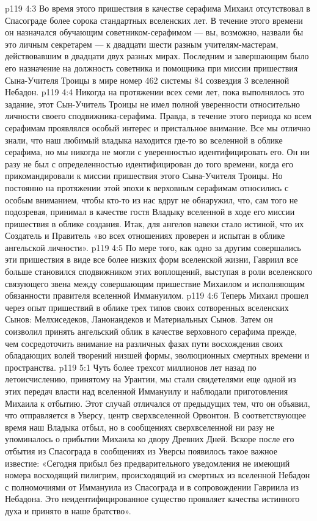 \vs p119 4:3 Во время этого пришествия в качестве серафима Михаил отсутствовал в Спасограде более сорока стандартных вселенских лет. В течение этого времени он назначался обучающим советником\hyp{}серафимом --- вы, возможно, назвали бы это личным секретарем --- к двадцати шести разным учителям\hyp{}мастерам, действовавшим в двадцати двух разных мирах. Последним и завершающим было его назначение на должность советника и помощника при миссии пришествия Сына\hyp{}Учителя Троицы в мире номер 462 системы 84 созвездия 3 вселенной Небадон.
\vs p119 4:4 Никогда на протяжении всех семи лет, пока выполнялось это задание, этот Сын\hyp{}Учитель Троицы не имел полной уверенности относительно личности своего сподвижника\hyp{}серафима. Правда, в течение этого периода ко всем серафимам проявлялся особый интерес и пристальное внимание. Все мы отлично знали, что наш любимый владыка находится где\hyp{}то во вселенной в облике серафима, но мы никогда не могли с уверенностью идентифицировать его. Он ни разу не был с определенностью идентифицирован до того времени, когда его прикомандировали к миссии пришествия этого Сына\hyp{}Учителя Троицы. Но постоянно на протяжении этой эпохи к верховным серафимам относились с особым вниманием, чтобы кто\hyp{}то из нас вдруг не обнаружил, что, сам того не подозревая, принимал в качестве гостя Владыку вселенной в ходе его миссии пришествия в облике создания. Итак, для ангелов навеки стало истиной, что их Создатель и Правитель «во всех отношениях проверен и испытан в облике ангельской личности».
\vs p119 4:5 По мере того, как одно за другим совершались эти пришествия в виде все более низких форм вселенской жизни, Гавриил все больше становился сподвижником этих воплощений, выступая в роли вселенского связующего звена между совершающим пришествие Михаилом и исполняющим обязанности правителя вселенной Иммануилом.
\vs p119 4:6 \pc Теперь Михаил прошел через опыт пришествий в облике трех типов своих сотворенных вселенских Сынов: Мелхиседеков, Ланонандеков и Материальных Сынов. Затем он соизволил принять ангельский облик в качестве верховного серафима прежде, чем сосредоточить внимание на различных фазах пути восхождения своих обладающих волей творений низшей формы, эволюционных смертных времени и пространства.
\vs p119 5:1 Чуть более трехсот миллионов лет назад по летоисчислению, принятому на Урантии, мы стали свидетелями еще одной из этих передач власти над вселенной Иммануилу и наблюдали приготовления Михаила к отбытию. Этот случай отличался от предыдущих тем, что он объявил, что отправляется в Уверсу, центр сверхвселенной Орвонтон. В соответствующее время наш Владыка отбыл, но в сообщениях сверхвселенной ни разу не упоминалось о прибытии Михаила ко двору Древних Дней. Вскоре после его отбытия из Спасограда в сообщениях из Уверсы появилось такое важное известие: «Сегодня прибыл без предварительного уведомления не имеющий номера восходящий пилигрим, происходящий из смертных из вселенной Небадон с полномочиями от Иммануила из Спасограда и в сопровождении Гавриила из Небадона. Это неидентифицированное существо проявляет качества истинного духа и принято в наше братство».
